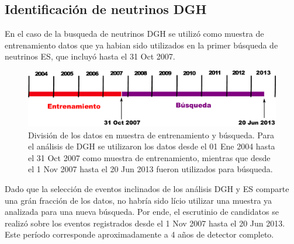 	\subsection{Identificación de neutrinos DGH}
	
	En el caso de la busqueda de neutrinos DGH se utilizó como muestra de entrenamiento datos que ya habian sido utilizados en la primer búsqueda de neutrinos ES, que incluyó hasta el 31 Oct 2007.
	\begin{figure}[ht]
	\begin{center}
	\includegraphics[width=\textwidth]{fig/seleccionAuger/periodosDGH}
	\caption{División de los datos en muestra de entrenamiento y búsqueda. Para el análisis de DGH se utilizaron los datos desde el 01 Ene 2004 hasta el 31 Oct 2007 como muestra de entrenamiento, mientras que desde el 1 Nov 2007 hasta el 20 Jun 2013 fueron utilizados para búsqueda.}
	\label{fig:periodosDGH}
	\end{center}
	\end{figure}
	Dado que la selección de eventos inclinados de los análisis DGH y ES comparte una grán fracción de los datos, no habría sido lício utilizar una muestra ya analizada para una nueva búsqueda.
	Por ende, el escrutinio de candidatos se realizó sobre los eventos registrados desde el 1 Nov 2007 hasta el 20 Jun 2013.
	Este período corresponde aproximadamente a 4 años de detector completo.
	
